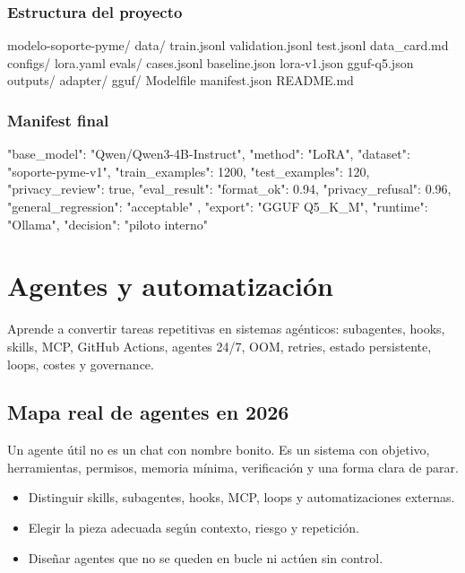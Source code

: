 \documentclass[11pt,a4paper]{book}
\begin{document}
\section{Estructura del proyecto}
\begin{codebox}
modelo-soporte-pyme/
  data/
    train.jsonl
    validation.jsonl
    test.jsonl
    data_card.md
  configs/
    lora.yaml
  evals/
    cases.jsonl
    baseline.json
    lora-v1.json
    gguf-q5.json
  outputs/
    adapter/
    gguf/
  Modelfile
  manifest.json
  README.md
\end{codebox}
\section{Manifest final}
\begin{codebox}
{
  "base_model": "Qwen/Qwen3-4B-Instruct",
  "method": "LoRA",
  "dataset": "soporte-pyme-v1",
  "train_examples": 1200,
  "test_examples": 120,
  "privacy_review": true,
  "eval_result": {
    "format_ok": 0.94,
    "privacy_refusal": 0.96,
    "general_regression": "acceptable"
  },
  "export": "GGUF Q5_K_M",
  "runtime": "Ollama",
  "decision": "piloto interno"
}
\end{codebox}
\part{Agentes y automatización}
Aprende a convertir tareas repetitivas en sistemas agénticos: subagentes, hooks, skills, MCP, GitHub Actions, agentes 24/7, OOM, retries, estado persistente, loops, costes y governance.

\chapter{Mapa real de agentes en 2026}
Un agente útil no es un chat con nombre bonito. Es un sistema con objetivo, herramientas, permisos, memoria mínima, verificación y una forma clara de parar.

\begin{itemize}\item Distinguir skills, subagentes, hooks, MCP, loops y automatizaciones externas.\end{itemize}
\begin{itemize}\item Elegir la pieza adecuada según contexto, riesgo y repetición.\end{itemize}
\begin{itemize}\item Diseñar agentes que no se queden en bucle ni actúen sin control.\end{itemize}
\end{document}
